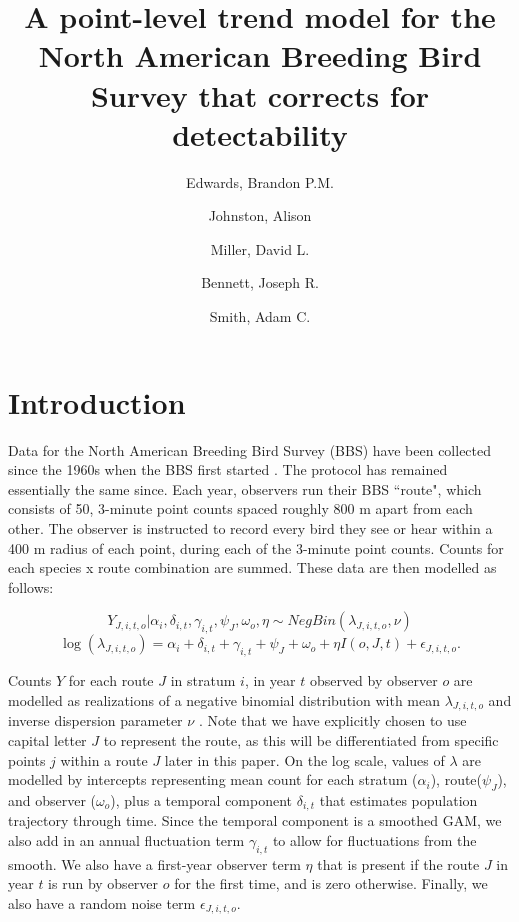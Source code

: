 \documentclass[12pt]{article}
\title{A point-level trend model for the North American Breeding Bird Survey that corrects for detectability}
\author{
	Edwards, Brandon P.M.\\
	\and
	Johnston, Alison\\
	\and
	Miller, David L.\\
	\and
	Bennett, Joseph R.\\
	\and
	Smith, Adam C.\\
}
\begin{document}
	
	\maketitle
	
		
	
\section{Introduction}
\par Data for the North American Breeding Bird Survey (BBS) have been collected since the 1960s when the BBS first started \citep{hudson_role_2017, sauer_first_2017}. 
The protocol has remained essentially the same since. 
Each year, observers run their BBS ``route", which consists of 50, 3-minute point counts spaced roughly 800 m apart from each other. 
The observer is instructed to record every bird they see or hear within a 400 m radius of each point, during each of the 3-minute point counts. 
Counts for each species x route combination are summed.
These data are then modelled as follows:

\begin{equation*}
	Y_{J,i,t,o} | \alpha_i, \delta_{i,t}, \gamma_{i,t}, \psi_J, \omega_o, \eta \sim NegBin(\lambda_{J,i,t,o}, \nu)
\end{equation*}
\begin{equation}\label{bbs}
\log(\lambda_{J,i,t,o}) = \alpha_i + \delta_{i,t} + \gamma_{i,t} + \psi_J + \omega_o + \eta I(o,J,t) + \epsilon_{J,i,t,o}.
\end{equation}

Counts $Y$ for each route $J$ in stratum $i$, in year $t$ observed by observer $o$ are modelled as realizations of a negative binomial distribution with mean $\lambda_{J,i,t,o}$ and inverse dispersion parameter $\nu$ \citet{smith_spatially_2023}. 
Note that we have explicitly chosen to use capital letter $J$ to represent the route, as this will be differentiated from specific points $j$ within a route $J$ later in this paper.
On the log scale, values of $\lambda$ are modelled by intercepts representing mean count for each stratum ($\alpha_i$), route($\psi_J$), and observer ($\omega_o$), plus a temporal component $\delta_{i,t}$ that estimates population trajectory through time. 
Since the temporal component is a smoothed GAM, we also add in an annual fluctuation term $\gamma_{i,t}$ to allow for fluctuations from the smooth. 
We also have a first-year observer term $\eta$ that is present if the route $J$ in year $t$ is run by observer $o$ for the first time, and is zero otherwise. 
Finally, we also have a random noise term $\epsilon_{J,i,t,o}$.
\end{document}
